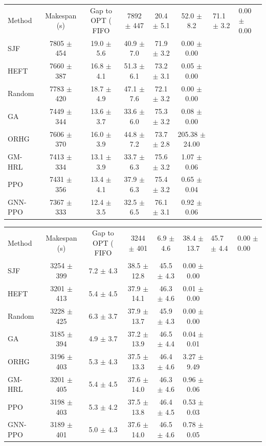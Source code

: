 \begin{tabular}{lccccc}
\toprule
Method & Makespan (s) & Gap to OPT (%
\midrule
FIFO & 7892 $\pm$ 447 & 20.4 $\pm$ 5.1 & 52.0 $\pm$ 8.2 & 71.1 $\pm$ 3.2 & 0.00 $\pm$ 0.00 \\
SJF & 7805 $\pm$ 454 & 19.0 $\pm$ 5.6 & 40.9 $\pm$ 7.0 & 71.9 $\pm$ 3.2 & 0.00 $\pm$ 0.00 \\
HEFT & 7660 $\pm$ 387 & 16.8 $\pm$ 4.1 & 51.3 $\pm$ 6.1 & 73.2 $\pm$ 3.1 & 0.05 $\pm$ 0.00 \\
Random & 7783 $\pm$ 420 & 18.7 $\pm$ 4.9 & 47.1 $\pm$ 7.6 & 72.1 $\pm$ 3.2 & 0.00 $\pm$ 0.00 \\
GA & 7449 $\pm$ 344 & 13.6 $\pm$ 3.7 & 33.6 $\pm$ 6.0 & 75.3 $\pm$ 3.2 & 0.08 $\pm$ 0.00 \\
ORHG & 7606 $\pm$ 370 & 16.0 $\pm$ 3.9 & 44.8 $\pm$ 7.2 & 73.7 $\pm$ 2.8 & 205.38 $\pm$ 24.00 \\
GM-HRL & 7413 $\pm$ 334 & 13.1 $\pm$ 3.9 & 33.7 $\pm$ 6.3 & 75.6 $\pm$ 3.2 & 1.07 $\pm$ 0.06 \\
PPO & 7431 $\pm$ 356 & 13.4 $\pm$ 4.1 & 37.9 $\pm$ 6.3 & 75.4 $\pm$ 3.2 & 0.65 $\pm$ 0.04 \\
GNN-PPO & 7367 $\pm$ 333 & 12.4 $\pm$ 3.5 & 32.5 $\pm$ 6.5 & 76.1 $\pm$ 3.1 & 0.92 $\pm$ 0.06 \\
\bottomrule
\end{tabular}

\begin{tabular}{lccccc}
\toprule
Method & Makespan (s) & Gap to OPT (%
\midrule
FIFO & 3244 $\pm$ 401 & 6.9 $\pm$ 4.6 & 38.4 $\pm$ 13.7 & 45.7 $\pm$ 4.4 & 0.00 $\pm$ 0.00 \\
SJF & 3254 $\pm$ 399 & 7.2 $\pm$ 4.3 & 38.5 $\pm$ 12.8 & 45.5 $\pm$ 4.3 & 0.00 $\pm$ 0.00 \\
HEFT & 3201 $\pm$ 413 & 5.4 $\pm$ 4.5 & 37.9 $\pm$ 14.1 & 46.3 $\pm$ 4.6 & 0.01 $\pm$ 0.00 \\
Random & 3228 $\pm$ 425 & 6.3 $\pm$ 3.7 & 37.9 $\pm$ 13.7 & 45.9 $\pm$ 4.3 & 0.00 $\pm$ 0.00 \\
GA & 3185 $\pm$ 394 & 4.9 $\pm$ 3.7 & 37.2 $\pm$ 13.9 & 46.5 $\pm$ 4.4 & 0.04 $\pm$ 0.01 \\
ORHG & 3196 $\pm$ 403 & 5.3 $\pm$ 4.3 & 37.5 $\pm$ 13.3 & 46.4 $\pm$ 4.6 & 3.27 $\pm$ 9.49 \\
GM-HRL & 3201 $\pm$ 405 & 5.4 $\pm$ 4.5 & 37.6 $\pm$ 14.0 & 46.3 $\pm$ 4.6 & 0.96 $\pm$ 0.06 \\
PPO & 3198 $\pm$ 403 & 5.3 $\pm$ 4.2 & 37.5 $\pm$ 13.8 & 46.4 $\pm$ 4.5 & 0.53 $\pm$ 0.03 \\
GNN-PPO & 3189 $\pm$ 401 & 5.0 $\pm$ 4.3 & 37.6 $\pm$ 14.0 & 46.5 $\pm$ 4.6 & 0.78 $\pm$ 0.05 \\
\bottomrule
\end{tabular}

